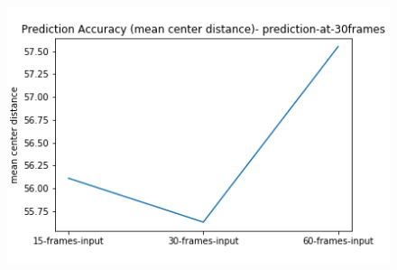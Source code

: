 \begin{figure}[H]
\includegraphics[scale=1.0]{prediction-at-30frames-mean_distance_accuracy}
\begin{center}
\end{center}
\end{figure}











